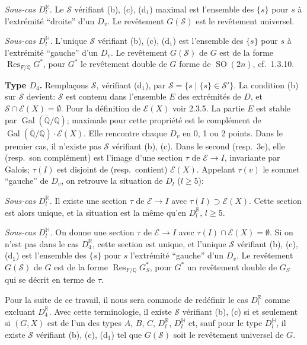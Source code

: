 \documentclass[12pt,a4paper]{article}
\theoremstyle{plain}
\theoremstyle{definition}
\theoremstyle{remark}
\DeclareMathOperator{\Gal}{Gal}
\DeclareMathOperator{\Res}{Res}
\DeclareMathOperator{\SO}{SO}
\newcommand{\QQ}{\mathbb{Q}}
\newcommand{\RR}{\mathbb{R}}
\begin{document}
\textit{Sous-cas $D_l^{\RR}$.} Le $\mathcal{S}$ v\'erifiant (b), (c), (d$_1$) maximal est l'ensemble des $\{s\}$ pour $s$ \`a l'extr\'emit\'e ``droite'' d'un $D_v$. Le rev\^etement $G(\mathcal{S})$ est le rev\^etement universel.

\textit{Sous-cas $D_l^{\mathbb{H}}$.} L'unique $\mathcal{S}$ v\'erifiant (b), (c), (d$_1$) est l'ensemble des $\{s\}$ pour $s$ \`a l'extr\'emit\'e ``gauche'' d'un $D_v$. Le rev\^etement $G(\mathcal{S})$ de $G$ est de la forme $\Res_{F/\QQ} G^*$, pour $G^*$ le rev\^etement double de $G$ forme de $\SO(2n)$, cf.~1.3.10.

\textbf{Type $D_4$.} Rempla\c{c}ons $\mathcal{S}$, v\'erifiant (d$_1$), par $\mathcal{S} = \{s \mid \{s\} \in \mathcal{S}'\}$. La condition (b) sur $\mathcal{S}$ devient: $\mathcal{S}$ est contenu dans l'ensemble $E$ des extr\'emit\'es de $D$, et $\mathcal{S} \cap \mathcal{E}(X) = \emptyset$. Pour la d\'efinition de $\mathcal{E}(X)$ voir 2.3.5. La partie $E$ est stable par $\Gal(\overline{\QQ}/\QQ)$; maximale pour cette propri\'et\'e est le compl\'ement de $\Gal(\overline{\QQ}/\QQ) \cdot \mathcal{E}(X)$. Elle rencontre chaque $D_v$ en 0, 1 ou 2 points. Dans le premier cas, il n'existe pas $\mathcal{S}$ v\'erifiant (b), (c). Dans le second (resp.~3e), elle (resp.~son compl\'ement) est l'image d'une section $\tau$ de $\mathcal{E} \to I$, invariante par Galois; $\tau(I)$ est disjoint de (resp.~contient) $\mathcal{E}(X)$. Appelant $\tau(v)$ le sommet ``gauche'' de $D_v$, on retrouve la situation de $D_l$ ($l \ge 5$):

\textit{Sous-cas $D_l^{\RR}$.} Il existe une section $\tau$ de $\mathcal{E} \to I$ avec $\tau(I) \supset \mathcal{E}(X)$. Cette section est alors unique, et la situation est la m\^eme qu'en $D_l^{\RR}$, $l \ge 5$.

\textit{Sous-cas $D_l^{\mathbb{H}}$.} On donne une section $\tau$ de $\mathcal{E} \to I$ avec $\tau(I) \cap \mathcal{E}(X) = \emptyset$. Si on n'est pas dans le cas $D_4^{\RR}$, cette section est unique, et l'unique $\mathcal{S}$ v\'erifiant (b), (c), (d$_1$) est l'ensemble des $\{s\}$ pour $s$ l'extr\'emit\'e ``gauche'' d'un $D_v$. Le rev\^etement $G(\mathcal{S})$ de $G$ est de la forme $\Res_{F/\QQ} G^*_S$, pour $G^*$ un rev\^etement double de $G_S$ qui se d\'ecrit en terme de $\tau$.

Pour la suite de ce travail, il nous sera commode de red\'efinir le cas $D_l^{\RR}$ comme excluant $D_4^{\RR}$. Avec cette terminologie, il existe $\mathcal{S}$ v\'erifiant (b), (c) si et seulement si $(G,X)$ est de l'un des types $A$, $B$, $C$, $D_l^{\RR}$, $D_l^{\mathbb{H}}$ et, sauf pour le type $D_l^{\mathbb{H}}$, il existe $\mathcal{S}$ v\'erifiant (b), (c), (d$_1$) tel que $G(\mathcal{S})$ soit le rev\^etement universel de $G$.
\end{document}
